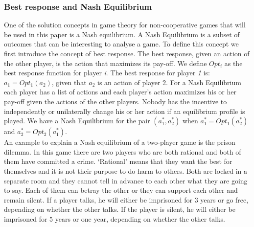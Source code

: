 \subsubsection{Best response and Nash Equilibrium}
One of the solution concepts in game theory for non-cooperative games that will be used in this paper is a Nash equilibrium. A Nash Equilibrium is a subset of outcomes that can be interesting to analyse a game. To define this concept we first introduce the concept of best response. The best response, given an action of the other player, is the action that maximizes its pay-off.  We define $Opt_{i}$ as the best response function for player \textit{i}. The best response for player \textit{1} is: $a_{1} = Opt_{1}(a_{2})$, given that $a_{2}$ is an action of player 2. For a Nash Equilibrium each player has a list of actions and each player's action maximizes his or her pay-off given the actions of the other players. Nobody has the incentive to independently or unilaterally change his or her action if an equilibrium profile is played. We have a Nash Equilibrium for the pair $(a_{1}^{*},a_{2}^{*})$ when $a_{1}^{*} = Opt_{1}(a_{2}^{*})$ and $a_{2}^{*} = Opt_{2}(a_{1}^{*})$.\\


An example to explain a Nash equilibrium of a two-player game is the prison dilemma. In this game there are two players who are both rational and both of them have committed a crime. `Rational' means that they want the best for themselves and it is not their purpose to do harm to others. Both are locked in a separate room and they cannot tell in advance to each other what they are going to say. Each of them can betray the other or they can support each other and remain silent. If a player talks, he will either be imprisoned for 3 years or go free, depending on whether the other talks. If the player is silent, he will either be imprisoned for 5 years or one year, depending on whether the other talks.  

